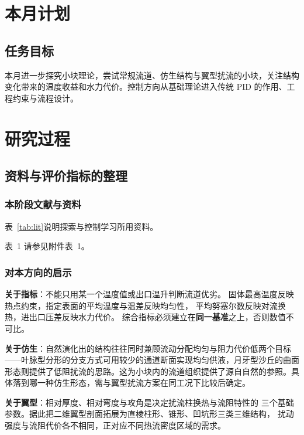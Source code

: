 \documentclass[stage2,fontset=fandol]{ydzjreport}
\makeatletter
\newcommand{\submissionnumber}[1]{\def\@currentlabel{#1}}
\makeatother
\begin{document}
\makestagetwohead

\section{本月计划}

\subsection{任务目标}

本月进一步探究小块理论，尝试常规流道、仿生结构与翼型扰流的小块，关注结构变化带来的温度收益和水力代价。控制方向从基础理论进入传统 PID 的作用、工程约束与流程设计。

\section{研究过程}

\subsection{资料与评价指标的整理}

\subsubsection{本阶段文献与资料}
表~\ref{tab:lit}说明探索与控制学习所用资料。


\par\noindent \begingroup\submissionnumber{1}\label{tab:lit}\endgroup 表~1 请参见附件表~1。\par


\subsubsection{对本方向的启示}

\textbf{关于指标}：不能只用某一个温度值或出口温升判断流道优劣。
固体最高温度反映热点约束，指定表面的平均温度与温差反映均匀性，
平均努塞尔数反映对流换热，进出口压差反映水力代价。
综合指标必须建立在\textbf{同一基准}之上，否则数值不可比。

\textbf{关于仿生}：自然演化出的结构往往同时兼顾流动分配均匀与阻力代价低两个目标——叶脉型分形的分支方式可用较少的通道断面实现均匀供液，月牙型沙丘的曲面形态则提供了低阻扰流的思路。这为小块内的流道组织提供了源自自然的参照。具体落到哪一种仿生形态，需与翼型扰流方案在同工况下比较后确定。

\textbf{关于翼型}：相对厚度、相对弯度与攻角是决定扰流柱换热与流阻特性的
三个基础参数。据此把二维翼型剖面拓展为直棱柱形、锥形、凹坑形三类三维结构，
扰动强度与流阻代价各不相同，正对应不同热流密度区域的需求。
\end{document}
